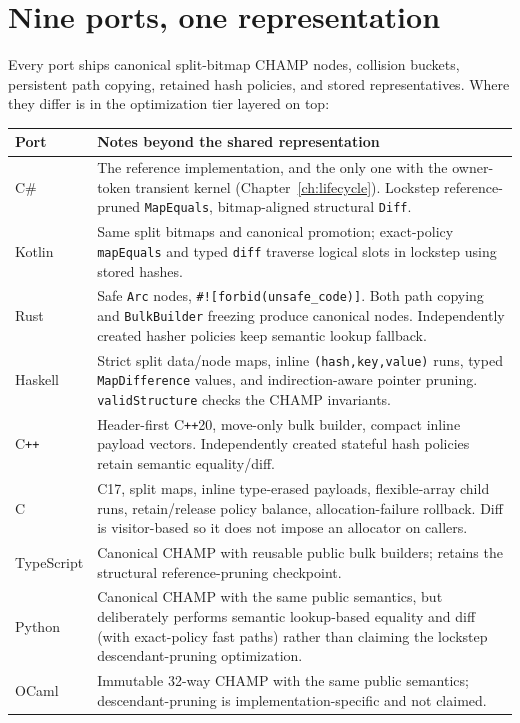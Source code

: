 \documentclass[11pt,twoside,openright]{book}
\makeatletter
\newcommand{\code}[1]{\texorpdfstring{\textcolor{d7ink}{\texttt{#1}}}{#1}}
\newenvironment{d7table}[1]
  {\par\vspace{3pt}\small
   \setlength{\LTpre}{4pt}\setlength{\LTpost}{4pt}
   \begin{longtable}{@{}%
     >{\raggedright\arraybackslash}p{#1\textwidth}%
     @{\hspace{10pt}}%
     >{\raggedright\arraybackslash}p{\dimexpr\textwidth-#1\textwidth-10pt\relax}@{}}}
  {\end{longtable}}
\newcommand{\thead}[1]{\sffamily\bfseries\footnotesize\color{d7ink}#1}
\makeatother
\begin{document}
\section{Nine ports, one representation}

Every port ships canonical split-bitmap CHAMP nodes, collision buckets,
persistent path copying, retained hash policies, and stored representatives.
Where they differ is in the optimization tier layered on top:

\begin{d7table}{0.15}
\toprule
\thead{Port} & \thead{Notes beyond the shared representation} \\
\midrule
C\#      & The reference implementation, and the only one with the owner-token
transient kernel (Chapter~\ref{ch:lifecycle}). Lockstep reference-pruned
\code{MapEquals}, bitmap-aligned structural \code{Diff}. \\
Kotlin   & Same split bitmaps and canonical promotion; exact-policy
\code{mapEquals} and typed \code{diff} traverse logical slots in lockstep using
stored hashes. \\
Rust     & Safe \code{Arc} nodes, \code{\#![forbid(unsafe\_code)]}. Both path
copying and \code{BulkBuilder} freezing produce canonical nodes. Independently
created hasher policies keep semantic lookup fallback. \\
Haskell  & Strict split data/node maps, inline \code{(hash,key,value)} runs,
typed \code{MapDifference} values, and indirection-aware pointer pruning.
\code{validStructure} checks the CHAMP invariants. \\
C\texttt{++} & Header-first C\texttt{++}20, move-only bulk builder, compact
inline payload vectors. Independently created stateful hash policies retain
semantic equality/diff. \\
C        & C17, split maps, inline type-erased payloads, flexible-array child
runs, retain/release policy balance, allocation-failure rollback. Diff is
visitor-based so it does not impose an allocator on callers. \\
TypeScript & Canonical CHAMP with reusable public bulk builders; retains the
structural reference-pruning checkpoint. \\
Python   & Canonical CHAMP with the same public semantics, but deliberately
performs semantic lookup-based equality and diff (with exact-policy fast paths)
rather than claiming the lockstep descendant-pruning optimization. \\
OCaml    & Immutable 32-way CHAMP with the same public semantics;
descendant-pruning is implementation-specific and not claimed. \\
\bottomrule
\end{d7table}
\end{document}
